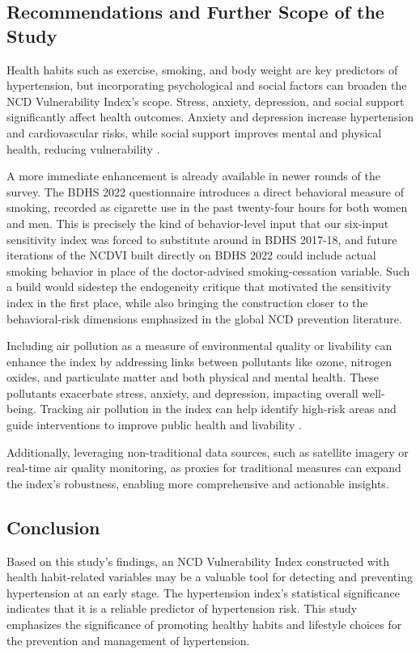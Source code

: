\documentclass[
  12pt,
  a4paper]{article}
\begin{document}
\subsection{Recommendations and Further Scope of the Study}\label{recommendations-and-further-scope-of-the-study}

Health habits such as exercise, smoking, and body weight are key predictors of hypertension, but incorporating psychological and social factors can broaden the NCD Vulnerability Index's scope. Stress, anxiety, depression, and social support significantly affect health outcomes. Anxiety and depression increase hypertension and cardiovascular risks, while social support improves mental and physical health, reducing vulnerability \citep{stewart1992measuring, cohen2015state, berkman1984assessing}.

A more immediate enhancement is already available in newer rounds of the survey. The BDHS 2022 questionnaire introduces a direct behavioral measure of smoking, recorded as cigarette use in the past twenty-four hours for both women and men. This is precisely the kind of behavior-level input that our six-input sensitivity index was forced to substitute around in BDHS 2017-18, and future iterations of the NCDVI built directly on BDHS 2022 could include actual smoking behavior in place of the doctor-advised smoking-cessation variable. Such a build would sidestep the endogeneity critique that motivated the sensitivity index in the first place, while also bringing the construction closer to the behavioral-risk dimensions emphasized in the global NCD prevention literature.

Including air pollution as a measure of environmental quality or livability can enhance the index by addressing links between pollutants like ozone, nitrogen oxides, and particulate matter and both physical and mental health. These pollutants exacerbate stress, anxiety, and depression, impacting overall well-being. Tracking air pollution in the index can help identify high-risk areas and guide interventions to improve public health and livability \citep{carlisle2001exercise, cai2016associations}.

Additionally, leveraging non-traditional data sources, such as satellite imagery or real-time air quality monitoring, as proxies for traditional measures can expand the index's robustness, enabling more comprehensive and actionable insights.

\subsection{Conclusion}\label{conclusion}

Based on this study's findings, an NCD Vulnerability Index constructed with health habit-related variables may be a valuable tool for detecting and preventing hypertension at an early stage. The hypertension index's statistical significance indicates that it is a reliable predictor of hypertension risk. This study emphasizes the significance of promoting healthy habits and lifestyle choices for the prevention and management of hypertension.


\end{document}
